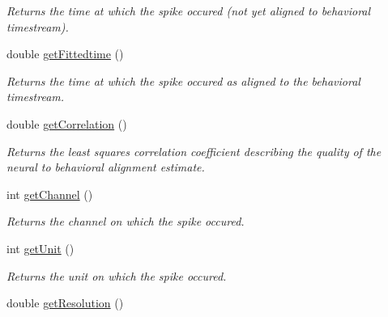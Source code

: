 \begin{DoxyCompactItemize}
\begin{DoxyCompactList}\small\item\em Returns the time at which the spike occured (not yet aligned to behavioral timestream). \end{DoxyCompactList}\item 
\hypertarget{class_picto_1_1_neural_data_unit_afa5e035fcfa5b0df630e01f570a581b0}{double \hyperlink{class_picto_1_1_neural_data_unit_afa5e035fcfa5b0df630e01f570a581b0}{get\-Fittedtime} ()}\label{class_picto_1_1_neural_data_unit_afa5e035fcfa5b0df630e01f570a581b0}

\begin{DoxyCompactList}\small\item\em Returns the time at which the spike occured as aligned to the behavioral timestream. \end{DoxyCompactList}\item 
\hypertarget{class_picto_1_1_neural_data_unit_a1bda76d767efdab3f2c3c8f88ded6945}{double \hyperlink{class_picto_1_1_neural_data_unit_a1bda76d767efdab3f2c3c8f88ded6945}{get\-Correlation} ()}\label{class_picto_1_1_neural_data_unit_a1bda76d767efdab3f2c3c8f88ded6945}

\begin{DoxyCompactList}\small\item\em Returns the least squares correlation coefficient describing the quality of the neural to behavioral alignment estimate. \end{DoxyCompactList}\item 
\hypertarget{class_picto_1_1_neural_data_unit_a150739bdffadcc6da44c7854173e4a13}{int \hyperlink{class_picto_1_1_neural_data_unit_a150739bdffadcc6da44c7854173e4a13}{get\-Channel} ()}\label{class_picto_1_1_neural_data_unit_a150739bdffadcc6da44c7854173e4a13}

\begin{DoxyCompactList}\small\item\em Returns the channel on which the spike occured. \end{DoxyCompactList}\item 
\hypertarget{class_picto_1_1_neural_data_unit_adcf50016891616837cefe6698b9563f8}{int \hyperlink{class_picto_1_1_neural_data_unit_adcf50016891616837cefe6698b9563f8}{get\-Unit} ()}\label{class_picto_1_1_neural_data_unit_adcf50016891616837cefe6698b9563f8}

\begin{DoxyCompactList}\small\item\em Returns the unit on which the spike occured. \end{DoxyCompactList}\item 
\hypertarget{class_picto_1_1_neural_data_unit_a720ebfba9377e2adfe4d4dddd46c9ccc}{double \hyperlink{class_picto_1_1_neural_data_unit_a720ebfba9377e2adfe4d4dddd46c9ccc}{get\-Resolution} ()}\label{class_picto_1_1_neural_data_unit_a720ebfba9377e2adfe4d4dddd46c9ccc}


\end{DoxyCompactItemize}
